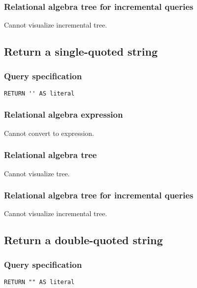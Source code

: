 \subsubsection*{Relational algebra tree for incremental queries}

Cannot visualize incremental tree.

\subsection{Return a single-quoted string}

\subsubsection*{Query specification}

\begin{lstlisting}
RETURN '' AS literal
\end{lstlisting}

\subsubsection*{Relational algebra expression}

Cannot convert to expression.

\subsubsection*{Relational algebra tree}

Cannot visualize tree.

\subsubsection*{Relational algebra tree for incremental queries}

Cannot visualize incremental tree.

\subsection{Return a double-quoted string}

\subsubsection*{Query specification}

\begin{lstlisting}
RETURN "" AS literal
\end{lstlisting}

